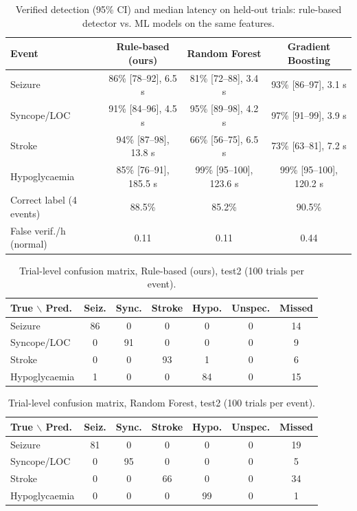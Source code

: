 \begin{table}[t]
\centering
\caption{Verified detection (95\% CI) and median latency on held-out trials: rule-based detector vs. ML models on the same features.}
\label{tab:ml_compare}
\footnotesize
\begin{tabular}{lccc}
\hline
Event & Rule-based (ours) & Random Forest & Gradient Boosting \\
\hline
Seizure & 86\% [78--92], 6.5 s & 81\% [72--88], 3.4 s & 93\% [86--97], 3.1 s \\
Syncope/LOC & 91\% [84--96], 4.5 s & 95\% [89--98], 4.2 s & 97\% [91--99], 3.9 s \\
Stroke & 94\% [87--98], 13.8 s & 66\% [56--75], 6.5 s & 73\% [63--81], 7.2 s \\
Hypoglycaemia & 85\% [76--91], 185.5 s & 99\% [95--100], 123.6 s & 99\% [95--100], 120.2 s \\
\hline
Correct label (4 events) & 88.5\% & 85.2\% & 90.5\% \\
False verif./h (normal) & 0.11 & 0.11 & 0.44 \\
\hline
\end{tabular}
\end{table}

\begin{table}[t]
\centering
\footnotesize
\caption{Trial-level confusion matrix, Rule-based (ours), test2 (100 trials per event).}
\label{tab:cm_rules}
\begin{tabular}{lcccccc}
\hline
True $\backslash$ Pred. & Seiz. & Sync. & Stroke & Hypo. & Unspec. & Missed \\
\hline
Seizure & 86 & 0 & 0 & 0 & 0 & 14 \\
Syncope/LOC & 0 & 91 & 0 & 0 & 0 & 9 \\
Stroke & 0 & 0 & 93 & 1 & 0 & 6 \\
Hypoglycaemia & 1 & 0 & 0 & 84 & 0 & 15 \\
\hline
\end{tabular}
\end{table}

\begin{table}[t]
\centering
\footnotesize
\caption{Trial-level confusion matrix, Random Forest, test2 (100 trials per event).}
\label{tab:cm_rf}
\begin{tabular}{lcccccc}
\hline
True $\backslash$ Pred. & Seiz. & Sync. & Stroke & Hypo. & Unspec. & Missed \\
\hline
Seizure & 81 & 0 & 0 & 0 & 0 & 19 \\
Syncope/LOC & 0 & 95 & 0 & 0 & 0 & 5 \\
Stroke & 0 & 0 & 66 & 0 & 0 & 34 \\
Hypoglycaemia & 0 & 0 & 0 & 99 & 0 & 1 \\
\hline
\end{tabular}
\end{table}


